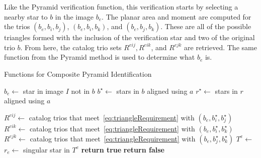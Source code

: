 Like the Pyramid verification function, this verification starts by selecting a nearby star to $b$ in the image $b_e$.
The planar area and moment are computed for the trios $(b_e, b_i, b_j)$, $(b_e, b_i, b_k)$, and $(b_e, b_j, b_k)$.
These are all of the possible triangles formed with the inclusion of the verification star and two of the original
trio $b$.
From here, the catalog trio sets $R^{eij}, R^{eik}$, and $R^{ejk}$ are retrieved.
The same function  from the Pyramid method is used to determine what $b_e$ is.
\begin{algorithm}
    \caption{Functions for Composite Pyramid Identification} \label{algorithm:compositePyramidHelpers}
    \begin{algorithmic}[1]
        \State $b_e \gets $ star in image $I$ not in $b$
        \State $b^{\star} \gets $ stars in $b$ aligned using $a$
        \State $r^{\star} \gets $ stars in $r$ aligned using $a$

        \State $R^{eij} \gets $ catalog trios that meet~\eqref{eq:triangleRequirement} with $(b_e, b^{\star}_i,
        b^{\star}_j)$
        \State $R^{eik} \gets $ catalog trios that meet~\eqref{eq:triangleRequirement} with $(b_e, b^{\star}_i,
        b^{\star}_k)$
        \State $R^{ejk} \gets $ catalog trios that meet~\eqref{eq:triangleRequirement} with $(b_e, b^{\star}_j,
        b^{\star}_k)$
        \State $T^e \gets $ 
        \\
        \State $r_e \gets $ singular star in $T^e$
        \State \textbf{return true}
        \EndIf
        \EndIf
        \State \textbf{return false}
        \EndFunction
    \end{algorithmic}
\end{algorithm}

